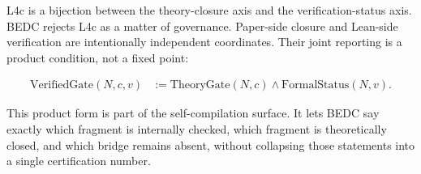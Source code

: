L4c is a bijection between the theory-closure axis and the verification-status
axis. BEDC rejects L4c as a matter of governance. Paper-side closure and
Lean-side verification are intentionally independent coordinates. Their joint
reporting is a product condition, not a fixed point:

$$
\begin{aligned}
\mathrm{VerifiedGate}(N,c,v)
  &:= \mathrm{TheoryGate}(N,c) \wedge \mathrm{FormalStatus}(N,v).
\end{aligned}
$$

This product form is part of the self-compilation surface. It lets BEDC say
exactly which fragment is internally checked, which fragment is theoretically
closed, and which bridge remains absent, without collapsing those statements
into a single certification number.
